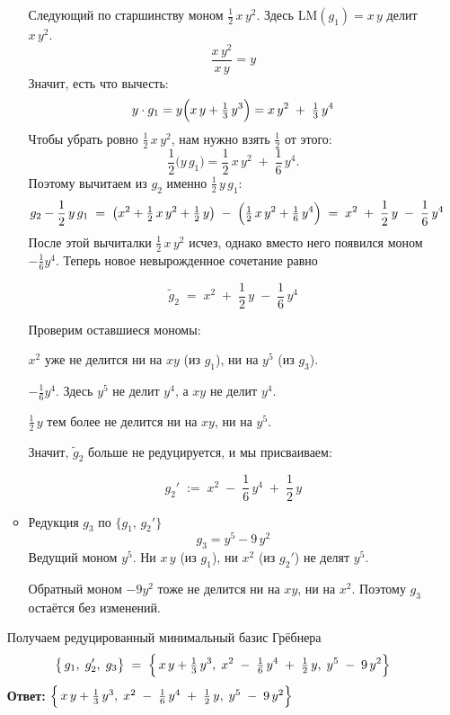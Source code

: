 \documentclass[a4paper]{article}
\begin{document}
\begin{enumerate}
\begin{itemize}
  Следующий по старшинству моном $\tfrac12\,x\,y^2$. Здесь $\mathrm{LM}(g_1)=x\,y$ 
  делит $x\,y^2$.
    $$
    \frac{x\,y^2}{\,x\,y\,} = y
    $$
    Значит, есть что вычесть:
    $$
    y \cdot g_1 
    = y\Bigl(x\,y + \tfrac13\,y^3\Bigr)
    = x\,y^2 \;+\; \tfrac13\,y^4
    $$
    Чтобы убрать ровно $\tfrac12\,x\,y^2$, нам нужно взять $\tfrac12$ от этого:
    $$
    \frac12 \bigl(y\,g_1\bigr) 
    = \frac12\,x\,y^2 \;+\; \frac{1}{6}\,y^4.
    $$
    Поэтому вычитаем из $g_2$ именно $\tfrac12\,y\,g_1$:
    $$
    g_2 
    - \frac12\,y\,g_1
    \;=\;
    \bigl(x^2 + \tfrac12\,x\,y^2 + \tfrac12\,y\bigr)
    \;-\;\Bigl(\tfrac12\,x\,y^2 + \tfrac{1}{6}\,y^4\Bigr)
    \;=\;
    x^2 
    \;+\; \frac12\,y 
    \;-\; \frac{1}{6}\,y^4
    $$
    После этой вычиталки $\tfrac12\,x\,y^2$ исчез, однако вместо него появился
     моном $-\tfrac{1}{6}y^4$.
   Теперь новое невырожденное сочетание равно

    $$
    \tilde g_2 \;=\; x^2 \;+\; \frac12\,y \;-\; \frac{1}{6}\,y^4
    $$

    Проверим оставшиеся мономы:

     $x^2$ уже не делится ни на $xy$ (из $g_1$), ни на $y^5$ (из $g_3$).

     $-\tfrac{1}{6}y^4$. Здесь $y^5$ не делит $y^4$, а $xy$ не делит $y^4$.

     $\tfrac12\,y$ тем более не делится ни на $xy$, ни на $y^5$.

      Значит, $\tilde g_2$ больше не редуцируется, и мы присваиваем:

    $$
    g_2' 
    \;:=\;
    x^2 \;-\; \frac{1}{6}\,y^4 \;+\; \frac12\,y
    $$

    \item Редукция $g_3$ по $\{g_1,\,g_2'\}$
    $$
    g_3 = y^5 - 9\,y^2
    $$
    Ведущий моном $y^5$. Ни $x\,y$ (из $g_1$), ни $x^2$ (из $g_2'$) не делят $y^5$.
    
    Обратный моном $-9y^2$ тоже не делится ни на $xy$, ни на $x^2$. Поэтому $g_3$ остаётся без изменений.
  \end{itemize}

  Получаем редуцированный минимальный базис Грёбнера
  $$
  \bigl\{\,g_1,\;g_2',\;g_3\bigr\} \;=\;
  \Bigl\{
  \,x\,y + \tfrac{1}{3}\,y^3,\;
  x^2 \;-\; \tfrac{1}{6}\,y^4 \;+\; \tfrac{1}{2}\,y,\;
  y^5 \;-\; 9\,y^2
  \Bigr\}
  $$
  \textbf{Ответ: } $\Bigl\{
  \,x\,y + \tfrac{1}{3}\,y^3,\;
  x^2 \;-\; \tfrac{1}{6}\,y^4 \;+\; \tfrac{1}{2}\,y,\;
  y^5 \;-\; 9\,y^2
  \Bigr\}$\\


\end{enumerate}
\end{document}
